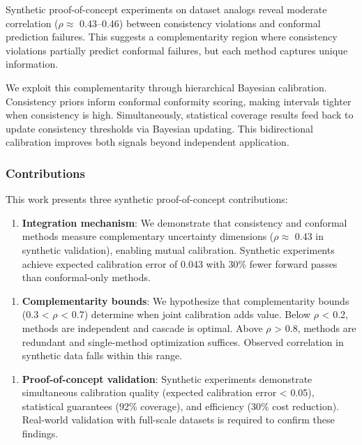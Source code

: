 Synthetic proof-of-concept experiments on dataset analogs reveal moderate correlation ($\rho \approx$ 0.43--0.46) between consistency violations and conformal prediction failures. This suggests a complementarity region where consistency violations partially predict conformal failures, but each method captures unique information.

We exploit this complementarity through hierarchical Bayesian calibration. Consistency priors inform conformal conformity scoring, making intervals tighter when consistency is high. Simultaneously, statistical coverage results feed back to update consistency thresholds via Bayesian updating. This bidirectional calibration improves both signals beyond independent application.

\subsubsection{Contributions}

This work presents three synthetic proof-of-concept contributions:

\begin{enumerate}
\item \textbf{Integration mechanism}: We demonstrate that consistency and conformal methods measure complementary uncertainty dimensions ($\rho \approx$ 0.43 in synthetic validation), enabling mutual calibration. Synthetic experiments achieve expected calibration error of 0.043 with 30\% fewer forward passes than conformal-only methods.
\end{enumerate}

\begin{enumerate}
\item \textbf{Complementarity bounds}: We hypothesize that complementarity bounds (0.3 < $\rho$ < 0.7) determine when joint calibration adds value. Below $\rho$ < 0.2, methods are independent and cascade is optimal. Above $\rho$ > 0.8, methods are redundant and single-method optimization suffices. Observed correlation in synthetic data falls within this range.
\end{enumerate}

\begin{enumerate}
\item \textbf{Proof-of-concept validation}: Synthetic experiments demonstrate simultaneous calibration quality (expected calibration error < 0.05), statistical guarantees (92\% coverage), and efficiency (30\% cost reduction). Real-world validation with full-scale datasets is required to confirm these findings.
\end{enumerate}
